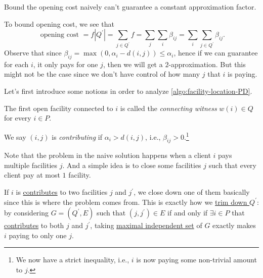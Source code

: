 \begin{remark}
	Bound the opening cost naively can't guarantee a constant approximation factor.
\end{remark}
\begin{explanation}
	To bound opening cost, we see that
	\[
		\text{ opening cost } = f \left\vert Q^\prime  \right\vert = \sum_{j\in Q^\prime }f = \sum_{j}\sum_{i} \beta _{ij} = \sum_{i} \sum_{j\in Q^\prime } \beta _{ij}.
	\]
	Observe that since \(\beta _{ij} = \max (0, \alpha _i - d(i, j)) \leq \alpha _i\), hence if we can guarantee for each \(i\), it only pays for one \(j\), then we will get a \(2\)-approximation. But this might not be the case since we don't have control of how many \(j\) that \(i\) is paying.
\end{explanation}

Let's first introduce some notions in order to analyze \autoref{algo:facility-location-PD}.

\begin{notation}\label{not:connecting-witness}
	The first open facility connected to \(i\) is called the \emph{connecting witness} \(w(i)\in Q\) for every \(i\in P\).
\end{notation}

\begin{notation}[Contributing]\label{not:contributing}
	We say \((i, j)\) is \emph{contributing} if \(\alpha _i > d(i, j)\), i.e., \(\beta _{ij} > 0\).\footnote{We now have a strict inequality, i.e., \(i\) is now paying some non-trivial amount to \(j\).}
\end{notation}

Note that the problem in the naive solution happens when a client \(i\) pays multiple facilities \(j\). And a simple idea is to close some facilities \(j\) such that every client pay at most \(1\) facility.

\begin{intuition}
	If \(i\) is \hyperref[not:contributing]{contributes} to two facilities \(j\) and \(j^\prime \), we close down one of them basically since this is where the problem comes from. This is exactly how we \hyperref[algo:facility-location-PD-comment]{trim down \(Q^\prime \)}: by considering \(G = (Q^\prime , E)\) such that \((j, j^\prime )\in E\) if and only if \(\exists i\in P\) that \hyperref[not:contributing]{contributes} to both \(j\) and \(j^\prime \), taking \hyperref[prb:max-strongly-independent-set]{maximal independent set} of \(G\) exactly makes \(i\) paying to only one \(j\).
\end{intuition}

